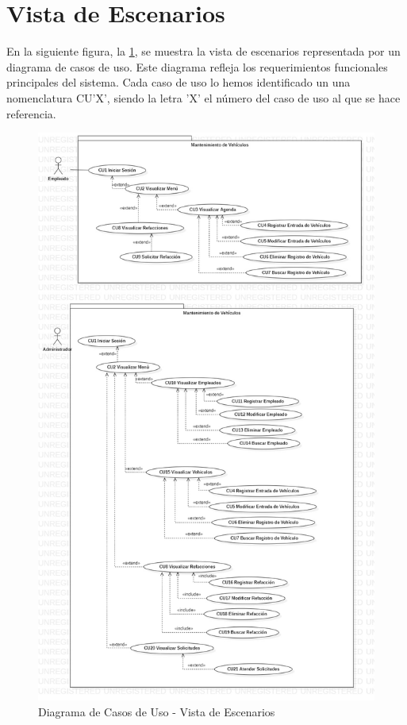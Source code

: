 \section{Vista de Escenarios}
En la siguiente figura, la \ref{fig:Diagrama de Casos de Uso - Vista de Escenarios}, se muestra la vista de escenarios representada por un diagrama de casos de uso. Este diagrama refleja los requerimientos funcionales principales del sistema. Cada caso de uso lo hemos identificado un una nomenclatura CU'X', siendo la letra 'X' el número del caso de uso al que se hace referencia.
\\
\begin{figure}[!h]
	\centering
	\includegraphics[width=1\textwidth]{./diseno/vescenarios/imagenes/vistaEscenarios}
	\caption{Diagrama de Casos de Uso - Vista de Escenarios}
	\label{fig:Diagrama de Casos de Uso - Vista de Escenarios}
\end{figure}
